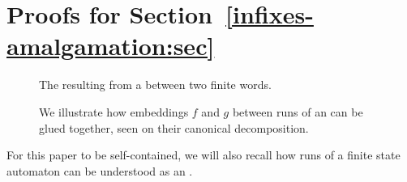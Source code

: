 \clearpage
\section{Proofs for Section~\ref{infixes-amalgamation:sec}}

\begin{figure}
    \centering
    
    \caption{The  resulting from a  between two 
    finite words.}
    \label{gap-word-embedding:fig}
\end{figure}

\begin{figure}
    \centering
    
    \caption{We illustrate how 
        embeddings $f$ and $g$ between runs of an
         can be glued
        together, seen on their canonical decomposition.
    }
    \label{amalgamation-runs:fig}
\end{figure}


For this paper to be self-contained, we will also recall how runs of a finite
state automaton can be understood as an .

